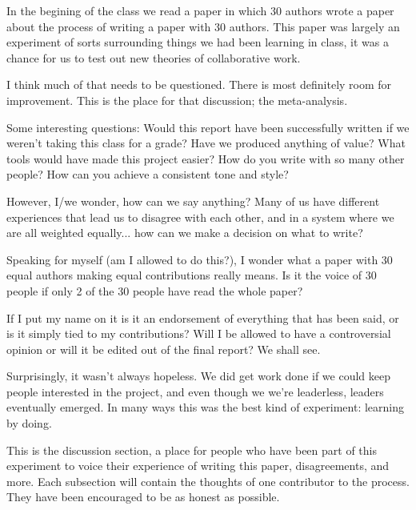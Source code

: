 In the begining of the class we read a paper \cite{tomlinson2012} in which 30 authors wrote a paper about the process of writing a paper with 30 authors. This paper was largely an experiment of sorts surrounding things we had been learning in class, it was a chance for us to test out new theories of collaborative work.

I think much of that needs to be questioned. There is most definitely room for improvement. This is the place for that discussion; the meta-analysis.

Some interesting questions:
Would this report have been successfully written if we weren't taking this class for a grade?
Have we produced anything of value?
What tools would have made this project easier? 
How do you write with so many other people? 
How can you achieve a consistent tone and style? 

However, I/we wonder, how can we say anything? Many of us have different experiences that lead us to disagree with each other, and in a system where we are all weighted equally... how can we make a decision on what to write?

Speaking for myself (am I allowed to do this?), I wonder what a paper with 30 equal authors making equal contributions really means. Is it the voice of 30 people if only 2 of the 30 people have read the whole paper?

If I put my name on it is it an endorsement of everything that has been said, or is it simply tied to my contributions? Will I be allowed to have a controversial opinion or will it be edited out of the final report? We shall see.

Surprisingly, it wasn't always hopeless. We did get work done if we could keep people interested in the project, and even though we we're leaderless, leaders eventually emerged. In many ways this was the best kind of experiment: learning by doing.  

This is the discussion section, a place for people who have been part of this experiment to voice their experience of writing this paper, disagreements, and more. Each subsection will contain the thoughts of one contributor to the process. They have been encouraged to be as honest as possible.




